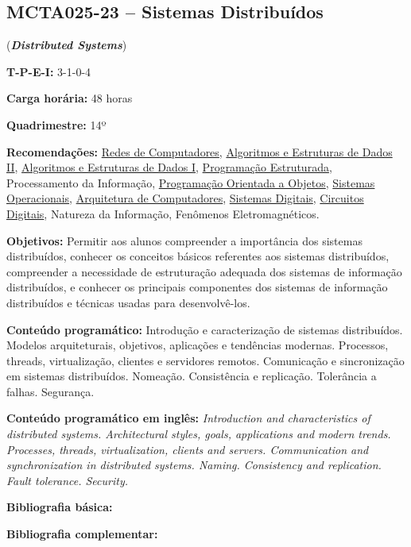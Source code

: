 \documentclass[class=article, crop=false]{standalone}
\begin{document}
\subsection{MCTA025-23 -- Sistemas Distribuídos}
\label{disc:sist_distr}

(\textbf{\textit{Distributed Systems}})

\begin{center}
\begin{minipage}{0.85\textwidth}
    \textbf{T-P-E-I:} 3-1-0-4
    
    \textbf{Carga horária:} 48 horas
    
    \textbf{Quadrimestre:} 14º
    
    \textbf{Recomendações:} 
    \hyperref[disc:redes]{Redes de Computadores},
    \hyperref[disc:aedII]{Algoritmos e Estruturas de Dados II},
    \hyperref[disc:aedI]{Algoritmos e Estruturas de Dados I},
    \hyperref[disc:pe]{Programação Estruturada},
    Processamento da Informação, 
    \hyperref[disc:poo]{Programação Orientada a Objetos},
    \hyperref[disc:so]{Sistemas Operacionais},
    \hyperref[disc:arq]{Arquitetura de Computadores},
    \hyperref[disc:sist_dig]{Sistemas Digitais},
    \hyperref[disc:circ_dig]{Circuitos Digitais},
    Natureza da Informação,
    Fenômenos Eletromagnéticos.
\end{minipage}
\end{center}

\textbf{Objetivos:}
Permitir aos alunos compreender a importância dos sistemas distribuídos,
conhecer os conceitos básicos referentes aos sistemas distribuídos, compreender
a necessidade de estruturação adequada dos sistemas de informação distribuídos,
e conhecer os principais componentes dos sistemas de informação distribuídos e
técnicas usadas para desenvolvê-los. 

\textbf{Conteúdo programático:}
Introdução e caracterização de sistemas distribuídos. 
Modelos arquiteturais, objetivos, aplicações e tendências modernas. 
Processos, threads, virtualização, clientes e servidores remotos. 
Comunicação e sincronização em sistemas distribuídos. 
Nomeação. 
Consistência e replicação. 
Tolerância a falhas. 
Segurança.

\textbf{Conteúdo programático em inglês:}
\textit{Introduction and characteristics of distributed systems. 
Architectural styles, goals, applications and modern trends. 
Processes, threads, virtualization, clients and servers. 
Communication and synchronization in distributed systems. 
Naming. 
Consistency and replication. 
Fault tolerance. 
Security.}


\newrefsection
\textbf{Bibliografia básica:}
\nocite{2007-tanenbaum, 2005-coulouris, 2007-ghosh}
\printbibliography

\newrefsection
\textbf{Bibliografia complementar:}
\nocite{2009-tanenbaum, 2006-ben, 2008-kshemkalyani, 1997-lynch, 2017-tanenbaum}
\printbibliography
\end{document}
